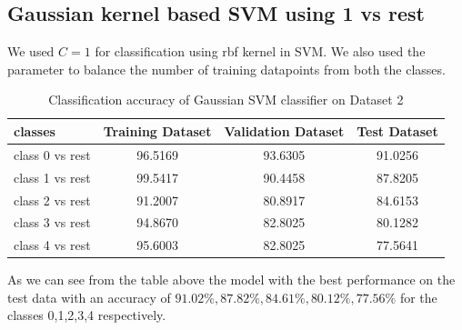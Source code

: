 \documentclass[11pt]{article}
\begin{document}
\subsection{Gaussian kernel based SVM using 1 vs rest}
We used $C =1$ for classification using rbf kernel in SVM. We also used the parameter to balance the number of training datapoints from both the classes. 
\begin{table}[h!]
\label{tab:tab3.2.1}
\begin{center}
\begin{tabular}{|l|c|c|c|}
\hline
\textbf{classes} & \textbf{Training Dataset} & \textbf{Validation Dataset} &\textbf{Test Dataset}\\
\hline
class 0 vs rest & 96.5169 & 93.6305 & 91.0256\\
\hline
class 1 vs rest & 99.5417 & 90.4458 & 87.8205\\
\hline
class 2 vs rest & 91.2007 & 80.8917 & 84.6153\\
\hline
class 3 vs rest & 94.8670 & 82.8025 & 80.1282\\
\hline
class 4 vs rest & 95.6003 & 82.8025 & 77.5641\\ 
\hline
\end{tabular}
\caption{Classification accuracy of Gaussian SVM classifier on Dataset 2}
\end{center}
\end{table}

As we can see from the table above the model with the best performance on the test data with an accuracy of $91.02\%, 87.82\%, 84.61\%, 80.12\%, 77.56\%$ for the classes 0,1,2,3,4 respectively. 
\end{document}
